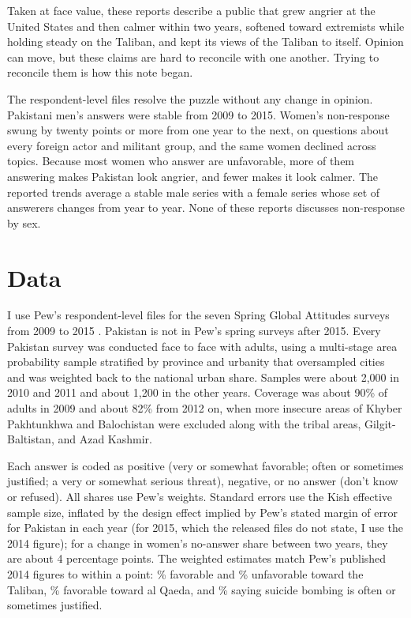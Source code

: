 \documentclass[11pt,letterpaper]{article}
\begin{document}
Taken at face value, these reports describe a public that grew angrier at the United States and then calmer within two years, softened toward extremists while holding steady on the Taliban, and kept its views of the Taliban to itself. Opinion can move, but these claims are hard to reconcile with one another. Trying to reconcile them is how this note began.

The respondent-level files resolve the puzzle without any change in opinion. Pakistani men's answers were stable from 2009 to 2015. Women's non-response swung by twenty points or more from one year to the next, on questions about every foreign actor and militant group, and the same women declined across topics. Because most women who answer are unfavorable, more of them answering makes Pakistan look angrier, and fewer makes it look calmer. The reported trends average a stable male series with a female series whose set of answerers changes from year to year. None of these reports discusses non-response by sex.

\section{Data}

I use Pew's respondent-level files for the seven Spring Global Attitudes surveys from 2009 to 2015 \citep{pewdata}. Pakistan is not in Pew's spring surveys after 2015. Every Pakistan survey was conducted face to face with adults, using a multi-stage area probability sample stratified by province and urbanity that oversampled cities and was weighted back to the national urban share. Samples were about 2,000 in 2010 and 2011 and about 1,200 in the other years. Coverage was about 90\% of adults in 2009 and about 82\% from 2012 on, when more insecure areas of Khyber Pakhtunkhwa and Balochistan were excluded along with the tribal areas, Gilgit-Baltistan, and Azad Kashmir.

Each answer is coded as positive (very or somewhat favorable; often or sometimes justified; a very or somewhat serious threat), negative, or no answer (don't know or refused). All shares use Pew's weights. Standard errors use the Kish effective sample size, inflated by the design effect implied by Pew's stated margin of error for Pakistan in each year (for 2015, which the released files do not state, I use the 2014 figure); for a change in women's no-answer share between two years, they are about 4 percentage points. The weighted estimates match Pew's published 2014 figures to within a point: \TalibanFav{}\% favorable and \TalibanUnfav{}\% unfavorable toward the Taliban, \QaedaFav{}\% favorable toward al Qaeda, and \SuicideYes{}\% saying suicide bombing is often or sometimes justified.
\end{document}
